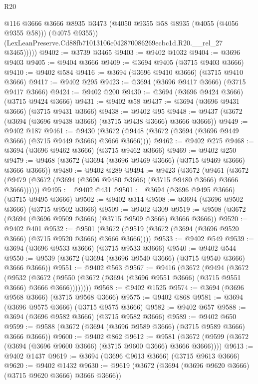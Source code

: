 \begin{lexlean}{R20}
\begin{coremodule}
              @116
              @3666
              @3666
              @8935
              @3473
              (@4050 @9355 @58 @8935 (@4055 (@4056 @9355 @58)))
              (@4075 @9355))
            (LexLeanPreserve.Cd88fb71013106c042870086269ecbc1d.R20.__rel_27 @3465)))))
@9402 := @3739 @3465
@9403 := @9402 @1032
@9404 := @3696 @9403
@9405 := @9404 @3666
@9409 := @3694 @9405 (@3715 @9403 @3666)
@9410 := @9402 @584
@9416 := @3694 (@3696 @9410 @3666) (@3715 @9410 @3666)
@9417 := @9402 @295
@9423 := @3694 (@3696 @9417 @3666) (@3715 @9417 @3666)
@9424 := @9402 @200
@9430 := @3694 (@3696 @9424 @3666) (@3715 @9424 @3666)
@9431 := @9402 @58
@9437 := @3694 (@3696 @9431 @3666) (@3715 @9431 @3666)
@9438 := @9402 @95
@9448 := @9437 (@3672 (@3694 (@3696 @9438 @3666) (@3715 @9438 @3666) @3666 @3666))
@9449 := @9402 @187
@9461 := @9430 (@3672 (@9448 (@3672 (@3694 (@3696 @9449 @3666) (@3715 @9449 @3666) @3666 @3666))))
@9462 := @9402 @275
@9468 := @3694 (@3696 @9462 @3666) (@3715 @9462 @3666)
@9469 := @9402 @250
@9479 := @9468 (@3672 (@3694 (@3696 @9469 @3666) (@3715 @9469 @3666) @3666 @3666))
@9480 := @9402 @289
@9494 := @9423
    (@3672
      (@9461 (@3672 (@9479 (@3672 (@3694 (@3696 @9480 @3666) (@3715 @9480 @3666) @3666 @3666))))))
@9495 := @9402 @431
@9501 := @3694 (@3696 @9495 @3666) (@3715 @9495 @3666)
@9502 := @9402 @314
@9508 := @3694 (@3696 @9502 @3666) (@3715 @9502 @3666)
@9509 := @9402 @309
@9519 := @9508 (@3672 (@3694 (@3696 @9509 @3666) (@3715 @9509 @3666) @3666 @3666))
@9520 := @9402 @401
@9532 := @9501 (@3672 (@9519 (@3672 (@3694 (@3696 @9520 @3666) (@3715 @9520 @3666) @3666 @3666))))
@9533 := @9402 @549
@9539 := @3694 (@3696 @9533 @3666) (@3715 @9533 @3666)
@9540 := @9402 @544
@9550 := @9539 (@3672 (@3694 (@3696 @9540 @3666) (@3715 @9540 @3666) @3666 @3666))
@9551 := @9402 @563
@9567 := @9416
    (@3672
      (@9494
        (@3672
          (@9532
            (@3672 (@9550 (@3672 (@3694 (@3696 @9551 @3666) (@3715 @9551 @3666) @3666 @3666))))))))
@9568 := @9402 @1525
@9574 := @3694 (@3696 @9568 @3666) (@3715 @9568 @3666)
@9575 := @9402 @868
@9581 := @3694 (@3696 @9575 @3666) (@3715 @9575 @3666)
@9582 := @9402 @657
@9588 := @3694 (@3696 @9582 @3666) (@3715 @9582 @3666)
@9589 := @9402 @650
@9599 := @9588 (@3672 (@3694 (@3696 @9589 @3666) (@3715 @9589 @3666) @3666 @3666))
@9600 := @9402 @862
@9612 := @9581 (@3672 (@9599 (@3672 (@3694 (@3696 @9600 @3666) (@3715 @9600 @3666) @3666 @3666))))
@9613 := @9402 @1437
@9619 := @3694 (@3696 @9613 @3666) (@3715 @9613 @3666)
@9620 := @9402 @1432
@9630 := @9619 (@3672 (@3694 (@3696 @9620 @3666) (@3715 @9620 @3666) @3666 @3666))

\end{coremodule}
\end{lexlean}
